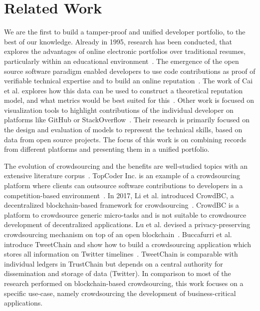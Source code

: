 \section{Related Work}
We are the first to build a tamper-proof and unified developer portfolio, to the best of our knowledge.
Already in 1995, research has been conducted, that explores the advantages of online electronic portfolios over traditional resumes, particularly within an educational environment~\cite{riggsby1995electronic,barrett2000electronic}.
The emergence of the open source software paradigm enabled developers to use code contributions as proof of verifiable technical expertise and to build an online reputation~\cite{riehle2015open}.
The work of Cai et al. explores how this data can be used to construct a theoretical reputation model, and what metrics would be best suited for this~\cite{cai2016reputation}.
Other work is focused on visualization tools to highlight contributions of the individual developer on platforms like GitHub or StackOverflow~\cite{jaruchotrattanasakul2016open,saxena2017know,chen2016supporting}.
Their research is primarily focused on the design and evaluation of models to represent the technical skills, based on data from open source projects.
The focus of this work is on combining records from different platforms and presenting them in a unified portfolio.

The evolution of crowdsourcing and the benefits are well-studied topics with an extensive literature corpus~\cite{latoza2016crowdsourcing}.
TopCoder Inc. is an example of a crowdsourcing platform where clients can outsource software contributions to developers in a competition-based environment~\cite{lakhani2010topcoder}.
In 2017, Li et al. introduced CrowdBC, a decentralized blockchain-based framework for crowdsourcing~\cite{li2017crowdbc}.
CrowdBC is a platform to crowdsource generic micro-tasks and is not suitable to crowdsource development of decentralized applications.
Lu et al. devised a privacy-preserving crowdsourcing mechanism on top of an open blockchain~\cite{lu2018zebralancer}.
Buccafurri et al. introduce TweetChain and show how to build a crowdsourcing application which stores all information on Twitter timelines~\cite{buccafurri2017tweetchain}.
TweetChain is comparable with individual ledgers in TrustChain but depends on a central authority for dissemination and storage of data (Twitter).
In comparison to most of the research performed on blockchain-based crowdsourcing, this work focuses on a specific use-case, namely crowdsourcing the development of business-critical applications.


